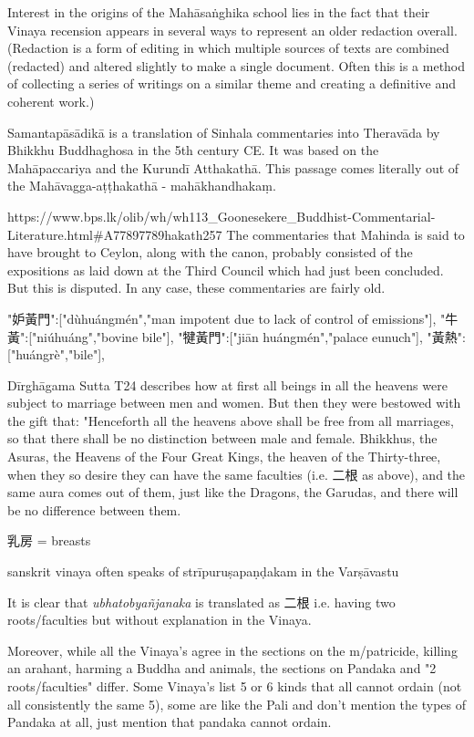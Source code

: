 Interest in the origins of the Mahāsaṅghika school lies in the fact that their Vinaya recension appears in several ways to represent an older redaction overall. (Redaction is a form of editing in which multiple sources of texts are combined (redacted) and altered slightly to make a single document. Often this is a method of collecting a series of writings on a similar theme and creating a definitive and coherent work.)



Samantapāsādikā is a translation of Sinhala commentaries into Theravāda by Bhikkhu Buddhaghosa in the 5th century CE. It was based on the Mahāpaccariya and the Kurundī Atthakathā. This passage comes literally out of the Mahāvagga-aṭṭhakathā - mahākhandhakaṃ.

https://www.bps.lk/olib/wh/wh113_Goonesekere_Buddhist-Commentarial-Literature.html#A77897789hakath257
 The commentaries that Mahinda is said to have brought to Ceylon, along with the canon, probably consisted of the expositions as laid down at the Third Council which had just been concluded. But this is disputed. In any case, these commentaries are fairly old.



"妒黃門":["dùhuángmén","man impotent due to lack of control of emissions"],
"牛黃":["niúhuáng","bovine bile"],
"犍黃門":["jiān huángmén","palace eunuch"],
"黃熱":["huángrè","bile"],


Dīrghāgama Sutta T24 describes how at first all beings in all the heavens were subject to marriage between men and women. But then they were bestowed with the gift that:
"Henceforth all the heavens above shall be free from all marriages, so that there shall be no distinction between male and female. Bhikkhus, the Asuras, the Heavens of the Four Great Kings, the heaven of the Thirty-three, when they so desire they can have the same faculties (i.e. 二根 as above), and the same aura comes out of them, just like the Dragons, the Garudas, and there will be no difference between them.


乳房 = breasts



sanskrit vinaya often speaks of strīpuruṣapaṇḍakam in the Varṣāvastu


It is clear that {\em ubhatob­yañ­janaka} is translated as 二根 i.e. having two roots/faculties but without explanation in the Vinaya. 


Moreover, while all the Vinaya's agree in the sections on the m/patricide, killing an arahant, harming a Buddha and animals, the sections on Pandaka and "2 roots/faculties" differ. Some Vinaya's list 5 or 6 kinds that all cannot ordain (not all consistently the same 5), some are like the Pali and don't mention the types of Pandaka at all, just mention that pandaka cannot ordain. 


